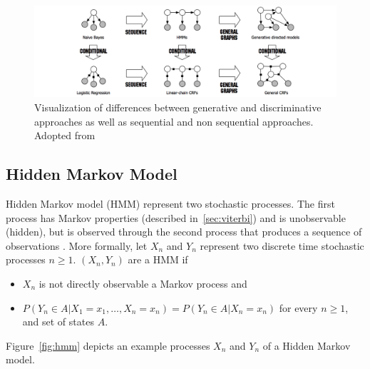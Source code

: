 
\begin{figure}
	\includegraphics[width=\textwidth]{different_markovs.png}
	\caption{Visualization of differences between generative and discriminative approaches
	as well as sequential and non sequential approaches.
	Adopted from \citep{sutton2012introduction}}
	\label{fig:different_graphicals}
\end{figure}




\subsection{Hidden Markov Model}
\label{sec:hmm}

Hidden Markov model (HMM) represent two stochastic 
processes.  
The first process has Markov properties (described in~\ref{sec:viterbi}) and
is unobservable (hidden), but is observed
through the second process that produces a sequence of
observations \citep{rabiner1986introduction}.
More formally, let 
$X_n$ and $Y_n$ represent two discrete time stochastic processes
$n \geq 1$. $(X_n, Y_n)$ are a HMM if 
\begin{itemize}
\item $X_n$ is not directly observable a Markov process and
\item 
$P(Y_n \in A | X_1 = x_1, \dots, X_n = x_n) = P(Y_n \in A | X_n = x_n)$
		for every $n \geq 1$, and set of states $A$. 
\end{itemize}
Figure~\ref{fig:hmm} depicts an example processes $X_n$ and $Y_n$ of a
Hidden Markov model. 

